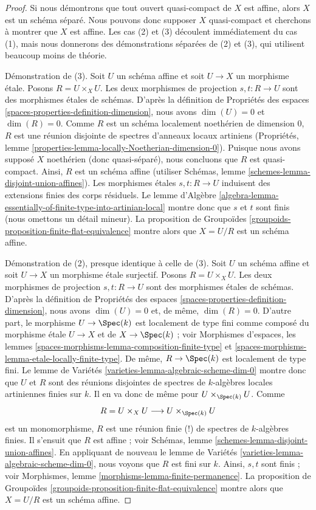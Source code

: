 \begin{proof}
Si nous démontrons que tout ouvert quasi-compact de $X$ est affine, alors
$X$ est un schéma séparé. Nous pouvons donc supposer $X$ quasi-compact
et cherchons à montrer que $X$ est affine.
Les cas (2) et (3) découlent immédiatement du cas (1), mais nous donnerons des
démonstrations séparées de (2) et (3), qui utilisent beaucoup moins de théorie.

\medskip\noindent
Démonstration de (3). Soit $U$ un schéma affine et soit $U \to X$ un
morphisme \'etale. Posons $R = U \times_X U$. Les deux morphismes de
projection $s, t : R \to U$ sont des morphismes étales de schémas. D'après la
définition de Propriétés des espaces \ref{spaces-properties-definition-dimension},
nous avons $\dim(U) = 0$ et $\dim(R) = 0$.
Comme $R$ est un schéma localement noethérien de dimension $0$,
$R$ est une réunion disjointe de spectres
d'anneaux locaux artiniens
(Propriétés, lemme \ref{properties-lemma-locally-Noetherian-dimension-0}).
Puisque nous avons supposé $X$ noethérien (donc quasi-séparé), nous
concluons que $R$ est quasi-compact. Ainsi, $R$ est un schéma affine
(utiliser Schémas, lemme \ref{schemes-lemma-disjoint-union-affines}).
Les morphismes étales $s, t : R \to U$ induisent des extensions finies
des corps résiduels. Le lemme d'Algèbre
\ref{algebra-lemma-essentially-of-finite-type-into-artinian-local}
montre donc que $s$ et $t$ sont finis
(nous omettons un détail mineur).
La proposition de Groupoïdes
\ref{groupoids-proposition-finite-flat-equivalence}
montre alors que $X = U/R$ est un schéma affine.

\medskip\noindent
Démonstration de (2), presque identique à celle de (3).
Soit $U$ un schéma affine et soit $U \to X$ un morphisme étale surjectif.
Posons $R = U \times_X U$. Les deux morphismes de projection
$s, t : R \to U$ sont des morphismes étales de schémas. D'après la
définition de Propriétés des espaces \ref{spaces-properties-definition-dimension},
nous avons $\dim(U) = 0$ et, de même, $\dim(R) = 0$.
D'autre part, le morphisme $U \to \Spec(k)$ est localement de type
fini comme composé du morphisme étale $U \to X$ et de
$X \to \Spec(k)$ ; voir
Morphismes d'espaces,
les lemmes \ref{spaces-morphisms-lemma-composition-finite-type} et
\ref{spaces-morphisms-lemma-etale-locally-finite-type}.
De même, $R \to \Spec(k)$ est localement de type fini.
Le lemme de Variétés
\ref{varieties-lemma-algebraic-scheme-dim-0}
montre donc que $U$ et $R$ sont des réunions disjointes de spectres de
$k$-algèbres locales artiniennes finies sur $k$. Il en va donc
de même pour $U \times_{\Spec(k)} U$. Comme
$$
R = U \times_X U \longrightarrow U \times_{\Spec(k)} U
$$
est un monomorphisme, $R$ est une réunion finie (!) de spectres de
$k$-algèbres finies. Il s'ensuit que $R$ est affine ; voir
Schémas, lemme \ref{schemes-lemma-disjoint-union-affines}.
En appliquant de nouveau le
lemme de Variétés \ref{varieties-lemma-algebraic-scheme-dim-0},
nous voyons que $R$ est fini sur $k$. Ainsi, $s, t$
sont finis ; voir
Morphismes, lemme \ref{morphisms-lemma-finite-permanence}.
La proposition de Groupoïdes
\ref{groupoids-proposition-finite-flat-equivalence}
montre alors que $X = U/R$ est un schéma affine.


\end{proof}
